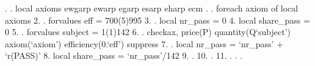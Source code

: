 . 
. local axioms ewgarp ewarp egarp esarp eharp ecm
{\smallskip}
. 
. foreach axiom of local axioms {\lbr}
  2.         
.         forvalues eff = 700(5)995 {\lbr}
  3.                 
.                 local nr_pass = 0
  4.                 local share_pass = 0
  5.                 
.                         forvalues subject = 1(1)142 {\lbr}
  6.                                 
.                                 checkax, price(P) quantity(Q`subject') axiom(`axiom') efficiency(0.`eff') suppress
  7.                                 
.                                 local nr_pass = `nr_pass' + `r(PASS)'
  8.                                 local share_pass = `nr_pass'/142
  9. 
.                         {\rbr}
 10.         
.         {\rbr}
 11. 
. {\rbr}
{\smallskip}
. 
. 
